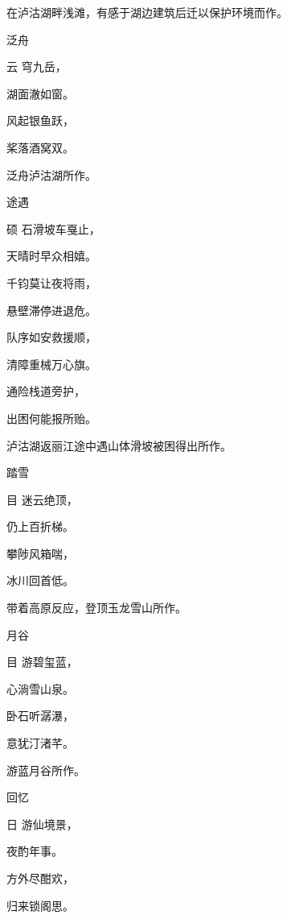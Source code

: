 \documentclass{article}
\newenvironment{poem}[3]{
\begin{minipage}{\textwidth}
\begin{pinyinscope}\begin{center}\Large\linespread{1.4}\selectfont #2\end{center}\end{pinyinscope}
\begin{pinyinscope}
	\begin{center}
	\Large\linespread{1.4}\rmfamily\selectfont #3
}{\end{center}
\end{pinyinscope}
\end{minipage}
}
\begin{document}
在泸沽湖畔浅滩，有感于湖边建筑后迁以保护环境而作。

\bigbreak

\begin{poem}{}{泛舟}
云穹{}九岳，

湖面澈如窗。

风起银鱼跃，

桨落酒窝双。
\end{poem}

泛舟泸沽湖所作。

\bigbreak


\begin{poem}{}{途遇}
硕石滑坡车戛止，

天晴时早众相嬉。

千钧莫让夜将雨，

悬壁滞停进退危。

队序如安救援顺，

清障重械万心旗。

{}通险栈道旁护，

出困何能报所贻。
\end{poem}

泸沽湖返丽江途中遇山体滑坡被困得出所作。


\bigbreak


\begin{poem}{}{踏雪}
目迷云绝顶，

仍上百折梯。

攀陟风箱喘，

冰川回首低。
\end{poem}

带着高原反应，登顶玉龙雪山所作。

\bigbreak


\begin{poem}{}{月谷}
目游碧玺蓝，

心淌雪山泉。

卧石听潺瀑，

意犹汀渚芊。
\end{poem}

游蓝月谷所作。

\bigbreak


\begin{poem}{}{回忆}
日游仙境景，

夜酌{}年事。

方外尽酣欢，

归来锁阁思。
\end{poem}
\end{document}
